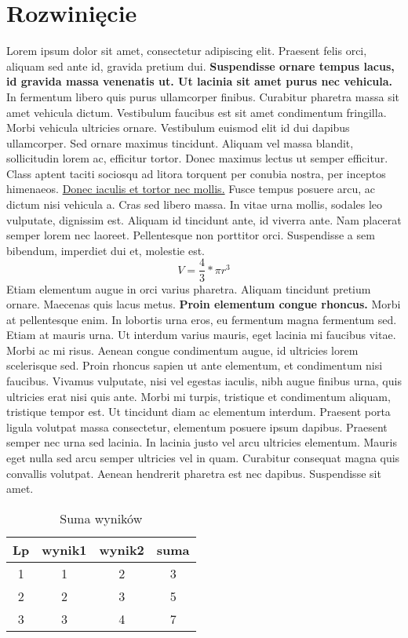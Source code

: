 \documentclass[12pt,a4paper]{article}
\begin{document}
	\section{Rozwinięcie}
	Lorem ipsum dolor sit amet, consectetur adipiscing elit. Praesent felis orci, aliquam sed ante id, gravida pretium dui. \textbf{Suspendisse ornare tempus lacus, id gravida massa venenatis ut. Ut lacinia sit amet purus nec vehicula.} In fermentum libero quis purus ullamcorper finibus. Curabitur pharetra massa sit amet vehicula dictum. Vestibulum faucibus est sit amet condimentum fringilla. Morbi vehicula ultricies ornare. Vestibulum euismod elit id dui dapibus ullamcorper. Sed ornare maximus tincidunt. Aliquam vel massa blandit, sollicitudin lorem ac, efficitur tortor. Donec maximus lectus ut semper efficitur. Class aptent taciti sociosqu ad litora torquent per conubia nostra, per inceptos himenaeos. \underline{Donec iaculis et tortor nec mollis.} Fusce tempus posuere arcu, ac dictum nisi vehicula a. Cras sed libero massa. In vitae urna mollis, sodales leo vulputate, dignissim est. Aliquam id tincidunt ante, id viverra ante. Nam placerat semper lorem nec laoreet. Pellentesque non porttitor orci. Suspendisse a sem bibendum, imperdiet dui et, molestie est.
    $$
        V=\frac{4}{3}*\pi r^3
    $$
    Etiam elementum augue in orci varius pharetra. Aliquam tincidunt pretium ornare. Maecenas quis lacus metus. \textbf{Proin elementum congue rhoncus.} Morbi at pellentesque enim. In lobortis urna eros, eu fermentum magna fermentum sed. Etiam at mauris urna. Ut interdum varius mauris, eget lacinia mi faucibus vitae. Morbi ac mi risus. Aenean congue condimentum augue, id ultricies lorem scelerisque sed. Proin rhoncus sapien ut ante elementum, et condimentum nisi faucibus. Vivamus vulputate, nisi vel egestas iaculis, nibh augue finibus urna, quis ultricies erat nisi quis ante. Morbi mi turpis, tristique et condimentum aliquam, tristique tempor est. Ut tincidunt diam ac elementum interdum. Praesent porta ligula volutpat massa consectetur, elementum posuere ipsum dapibus. Praesent semper nec urna sed lacinia. In lacinia justo vel arcu ultricies elementum. Mauris eget nulla sed arcu semper ultricies vel in quam. Curabitur consequat magna quis convallis volutpat. Aenean hendrerit pharetra est nec dapibus. Suspendisse sit amet. 
	\begin{table}[H]
		\centering
		\begin{tabular}{||c c c c||} 
			\hline
			Lp & wynik1 & wynik2 & suma \\ [0.5ex] 
			\hline\hline
			1 & 1 & 2 & 3 \\ 
			\hline
			2 & 2 & 3 & 5 \\
			\hline
			3 & 3 & 4 & 7 \\ [1ex] 
			\hline
		\end{tabular}
	\caption{Suma wyników}
	\label{table: Suma wyników}
	\end{table}
\end{document}

